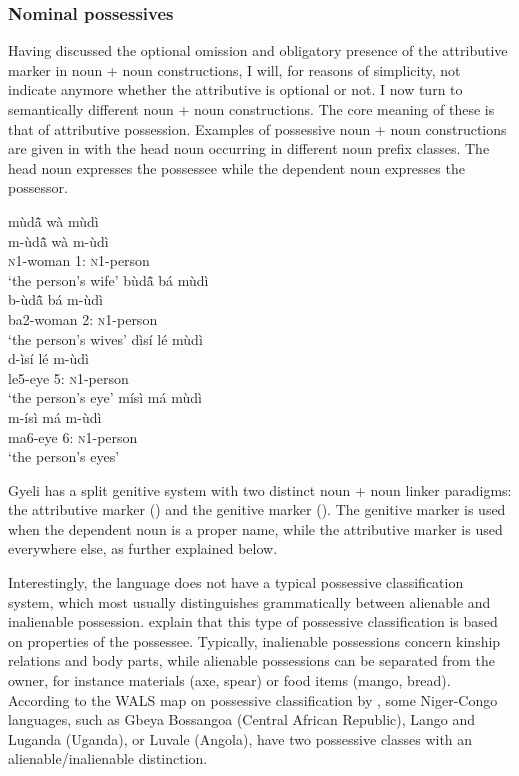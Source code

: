 \subsubsection{Nominal possessives}  
\label{sec:NomPOSS}

Having discussed the optional omission and obligatory presence of the attributive marker in noun + noun constructions, I will, for reasons of simplicity, not indicate anymore whether the attributive is optional or not.  I now turn to semantically different noun + noun constructions. The core meaning of these is that of attributive possession. Examples of possessive noun + noun constructions are given in  with the head noun occurring in different noun prefix classes. The head noun expresses the possessee while the dependent noun expresses the possessor.

\ea\label{possession}
\ea \label{possession1}
  \glll mùdã̂ wà mùdì \\
  m-ùdã̂ wà m-ùdì \\
               \textsc{n}1-woman 1:{\ATT} \textsc{n}1-person  \\
    \trans `the person's wife'
\ex \label{possession2}
  \glll  bùdã̂ bá mùdì \\
  b-ùdã̂ bá m-ùdì \\
               ba2-woman 2:{\ATT} \textsc{n}1-person  \\
    \trans `the person's wives'
\ex \label{possession3}
  \glll dìsí lé mùdì \\
  d-ìsí lé m-ùdì \\
               le5-eye 5:{\ATT} \textsc{n}1-person  \\
    \trans `the person's eye'
\ex \label{possession4}
  \glll     mísì má mùdì \\
  m-ísì má m-ùdì \\
               ma6-eye 6:{\ATT} \textsc{n}1-person  \\
    \trans `the person's eyes'
\z
\z

Gyeli has a split genitive system with two distinct noun + noun linker paradigms: the attributive marker () and the genitive marker (). The genitive marker is used when the dependent noun is a proper name, while the attributive marker is used everywhere else, as further explained below. 

Interestingly, the language does not have a typical possessive classification system, which most usually distinguishes grammatically between alienable and inalienable possession. \citet{nichols2013} explain that this type of possessive classification is based on properties of the possessee. Typically, inalienable possessions concern kinship relations and body parts, while alienable possessions can be separated from the owner, for instance materials (axe, spear) or food items (mango, bread). According to the WALS map on possessive classification by \citet{nichols2013}, some Niger-Congo languages, such as Gbeya Bossangoa (Central African Republic), Lango and Luganda (Uganda), or Luvale (Angola), have two possessive classes with an alienable/inalienable distinction.

